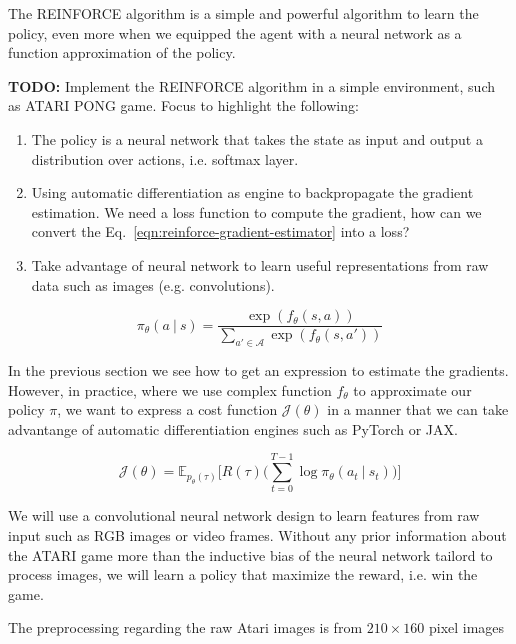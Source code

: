 The REINFORCE algorithm is a simple and powerful algorithm to learn the policy,
even more when we equipped the agent with a neural network as a function 
approximation of the policy. 

\textbf{TODO:} Implement the REINFORCE algorithm in a simple environment, such as ATARI PONG game. Focus to highlight the following:

\begin{enumerate}
    \item The policy is a neural network that takes the state as input and output a distribution over actions, i.e. softmax layer.  
    \item Using automatic differentiation as engine to backpropagate the gradient estimation. We need a loss function to compute the gradient, how
    can we convert the Eq.~\ref{eqn:reinforce-gradient-estimator} into a loss?
    \item Take advantage of neural network to learn useful representations from raw data such as images (e.g. convolutions).
\end{enumerate}

\begin{equation}\label{eqn:neural-softmax-policies}
    \pi_{\theta}(a~|~s) = \frac{\exp(f_{\theta}(s, a))}{\sum_{a'\in\mathcal{A}}\exp(f_{\theta}(s, a'))}
\end{equation}

In the previous section we see how to get an expression to estimate the gradients. However, in practice, where we use complex function
$f_{\theta}$ to approximate our policy $\pi$, we want to express a cost
function $\mathcal{J}(\theta)$ in a manner that we can take advantange of 
automatic differentiation engines such as PyTorch or JAX.

\begin{equation}\label{eqn:reinforce-gradient-estimator-cost}
    \mathcal{J}(\theta) = \mathbb{E}_{p_{\theta}(\tau)}\bigg[R(\tau)\bigg(\sum_{t=0}^{T-1} \log \pi_{\theta} (a_t~|~s_t) \bigg)\bigg] 
\end{equation}

We will use a convolutional neural network design to learn features from
raw input such as RGB images or video frames. Without any prior information about the ATARI game more than the inductive bias of the neural network tailord to process images, we will learn a policy that maximize the reward, i.e. win
the game.

The preprocessing regarding the raw Atari images is from $210\times 160$ pixel 
images

